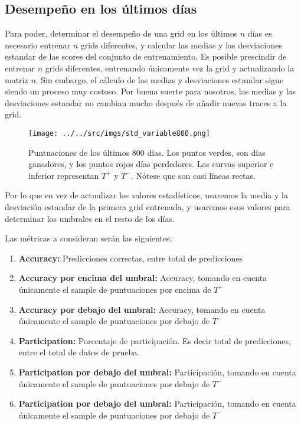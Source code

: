 \documentclass[11pt]{article}
\begin{document}
\subsection{Desempeño en los últimos días}
Para poder, determinar el desempeño de una grid en los últimos $n$ días es necesario entrenar $n$ grids diferentes, y calcular las medias y las desviaciones estandar de las scores del conjunto de entrenamiento. Es posible prescindir de entrenar $n$ grids diferentes, entrenando únicamente vez la grid y actualizando la matriz $n$. Sin embargo, el cálculo de las medias y desviaciones estandar sigue siendo un proceso muy costoso. Por buena suerte para nosotros, las medias y las desviaciones estandar no cambian mucho después de añadir nuevas traces a la grid. 
\begin{figure}[H]
    \centering
    \texttt{[image: ../../src/imgs/std\_variable800.png]}
    \caption{Puntuaciones de los últimos 800 días. Los puntos verdes, son días ganadores, y los puntos rojos días perdedores. Las curvas superior e inferior representan $T^+$ y $T^-$. Nótese que son casi líneas rectas.}
\end{figure}
Por lo que en vez de actualizar los valores estadísticos, usaremos la media y la desviación estandar de la primera grid entrenada, y usaremos esos valores para determinar los umbrales en el resto de los días.


Las métricas a consideran serán las siguientes:
\begin{enumerate}
    \item \textbf{Accuracy:} Predicciones correctas, entre total de predicciones
    \item \textbf{Accuracy por encima del umbral:} Accuracy, tomando en cuenta únicamente el sample de puntuaciones por encima de $T^+$
    \item \textbf{Accuracy por debajo del umbral:} Accuracy, tomando en cuenta únicamente el sample de puntuaciones por debajo de $T^-$
    \item \textbf{Participation:} Porcentaje de participación. Es decir total de predicciones, entre el total de datos de prueba.
    \item \textbf{Participation por debajo del umbral:} Participación, tomando en cuenta únicamente el sample de puntuaciones por debajo de $T^-$
    \item \textbf{Participation por debajo del umbral:} Participación, tomando en cuenta únicamente el sample de puntuaciones por debajo de $T^-$
\end{enumerate}
\
\end{document}
